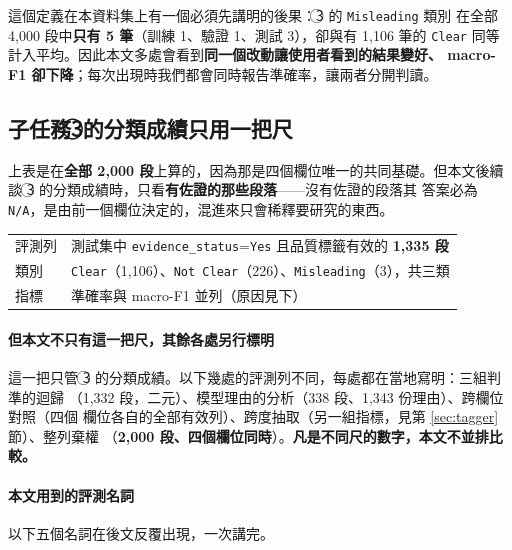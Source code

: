 \documentclass[11pt,a4paper]{ctexart}
\newcommand{\fn}[1]{\texttt{#1}}
\begin{document}
\medskip
這個定義在本資料集上有一個必須先講明的後果：\textcircled{3} 的 \fn{Misleading} 類別
在全部 4,000 段中\textbf{只有 5 筆}（訓練 1、驗證 1、測試 3），卻與有 1,106 筆的
\fn{Clear} 同等計入平均。因此本文多處會看到\textbf{同一個改動讓使用者看到的結果變好、
macro-F1 卻下降}；每次出現時我們都會同時報告準確率，讓兩者分開判讀。

\subsection{子任務\textcircled{3}的分類成績只用一把尺}
\label{sec:scale}

上表是在\textbf{全部 2,000 段}上算的，因為那是四個欄位唯一的共同基礎。但本文後續
談 \textcircled{3} 的分類成績時，只看\textbf{有佐證的那些段落}——沒有佐證的段落其
答案必為 \fn{N/A}，是由前一個欄位決定的，混進來只會稀釋要研究的東西。

\begin{table}[h]
\centering\small
\begin{tabular}{@{}ll@{}}
\toprule
評測列 & 測試集中 \fn{evidence\_status}=\fn{Yes} 且品質標籤有效的 \textbf{1{,}335 段} \\
類別 & \fn{Clear}（1{,}106）、\fn{Not Clear}（226）、\fn{Misleading}（3），共三類 \\
指標 & 準確率與 macro-F1 並列（原因見下） \\
\bottomrule
\end{tabular}
\end{table}

\paragraph{但本文不只有這一把尺，其餘各處另行標明} 這一把只管
\textcircled{3} 的分類成績。以下幾處的評測列不同，每處都在當地寫明：三組判準的迴歸
（1{,}332 段，二元）、模型理由的分析（338 段、1{,}343 份理由）、跨欄位對照（四個
欄位各自的全部有效列）、跨度抽取（另一組指標，見第 \ref{sec:tagger} 節）、整列棄權
（\textbf{2{,}000 段、四個欄位同時}）。\textbf{凡是不同尺的數字，本文不並排比較。}

\paragraph{本文用到的評測名詞} 以下五個名詞在後文反覆出現，一次講完。
\end{document}
